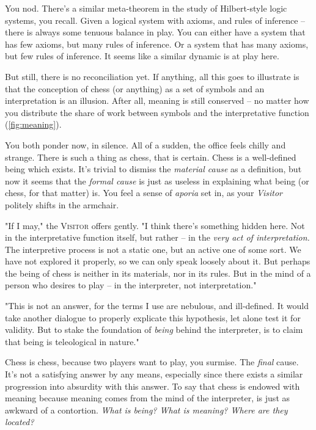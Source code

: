 You nod. There's a similar meta-theorem in the study of Hilbert-style logic systems, you recall. Given a logical system with axioms, and rules of inference -- there is always some tenuous balance in play. You can either have a system that has few axioms, but many rules of inference. Or a system that has many axioms, but few rules of inference. It seems like a similar dynamic is at play here.

But still, there is no reconciliation yet. If anything, all this goes to illustrate is that the conception of chess (or anything) as a set of symbols and an interpretation is an illusion. After all, meaning is still conserved -- no matter how you distribute the share of work between symbols and the interpretative function (\autoref{fig:meaning}).

You both ponder now, in silence. All of a sudden, the office feels chilly and strange. There is such a thing as chess, that is certain. Chess is a well-defined being which exists. It's trivial to dismiss the \emph{material cause} as a definition, but now it seems that the \emph{formal cause} is just as useless in explaining what being (or chess, for that matter) is. You feel a sense of \emph{aporia} set in, as your \emph{Visitor} politely shifts in the armchair.

"If I may," the \textsc{Visitor} offers gently. "I think there's something hidden here. Not in the interpretative function itself, but rather -- in the \emph{very act of interpretation.} The interpretive process is not a static one, but an active one of some sort. We have not explored it properly, so we can only speak loosely about it. But perhaps the being of chess is neither in its materials, nor in its rules. But in the mind of a person who desires to play -- in the interpreter, not interpretation."

"This is not an answer, for the terms I use are nebulous, and ill-defined. It would take another dialogue to properly explicate this hypothesis, let alone test it for validity. But to stake the foundation of \emph{being} behind the interpreter, is to claim that being is teleological in nature."

Chess is chess, because two players want to play, you surmise. The \emph{final} cause. It's not a satisfying answer by any means, especially since there exists a similar progression into absurdity with this answer. To say that chess is endowed with meaning because meaning comes from the mind of the interpreter, is just as awkward of a contortion. \emph{What is being? What is meaning? Where are they located?}

